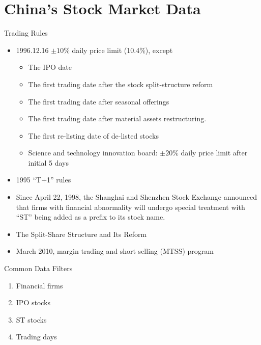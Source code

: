 \documentclass{beamer}
\begin{document}
\section{China's Stock Market Data}

\begin{frame}{Trading Rules}
	\begin{itemize}
		\item 1996.12.16 $\pm 10\%$ daily price limit (10.4\%), except
		\begin{itemize}
			\item The IPO date
			\item The first trading date after the stock split-structure reform
			\item The first trading date after seasonal offerings
			\item The first trading date after material assets restructuring.
			\item The first re-listing date of de-listed stocks
			\item Science and technology innovation board: $\pm 20\%$ daily price limit after initial 5 days
		\end{itemize}
		\item 1995 ``T+1'' rules
		\item Since April 22, 1998, the Shanghai and Shenzhen Stock Exchange announced that firms with financial abnormality will undergo special treatment with “ST” being added as a prefix to its stock name.
		\item The Split-Share Structure and Its Reform
		\item March 2010, margin trading and short selling (MTSS) program
	\end{itemize}
\end{frame}

\begin{frame}{Common Data Filters}
	\begin{enumerate}
		\item Financial firms
		\item IPO stocks
		\item ST stocks
		\item Trading days
	\end{enumerate}

\end{frame}
\end{document}
